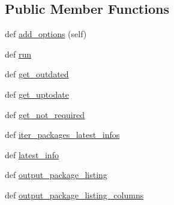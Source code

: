 \subsection*{Public Member Functions}
\begin{DoxyCompactItemize}
\item 
def \hyperlink{classpip_1_1__internal_1_1commands_1_1list_1_1ListCommand_adfb0b7f6deaa1764ffa657a678922b2a}{add\+\_\+options} (self)
\item 
def \hyperlink{classpip_1_1__internal_1_1commands_1_1list_1_1ListCommand_afc673827e6d4ed89888a0b287dbed954}{run}
\item 
def \hyperlink{classpip_1_1__internal_1_1commands_1_1list_1_1ListCommand_a31472ea227963bd0d9dea8a9a6d4d5f2}{get\+\_\+outdated}
\item 
def \hyperlink{classpip_1_1__internal_1_1commands_1_1list_1_1ListCommand_a955234b1f5a0cd66088d27f964a9cb7a}{get\+\_\+uptodate}
\item 
def \hyperlink{classpip_1_1__internal_1_1commands_1_1list_1_1ListCommand_ab6e282b84844c04d03f8da5591a19fa9}{get\+\_\+not\+\_\+required}
\item 
def \hyperlink{classpip_1_1__internal_1_1commands_1_1list_1_1ListCommand_a69e69feee882d365c5deb7271c894bc6}{iter\+\_\+packages\+\_\+latest\+\_\+infos}
\item 
def \hyperlink{classpip_1_1__internal_1_1commands_1_1list_1_1ListCommand_a2c9f936036792522a83fc7654de8e5ae}{latest\+\_\+info}
\item 
def \hyperlink{classpip_1_1__internal_1_1commands_1_1list_1_1ListCommand_a8b97e54c953af1405962712670f61919}{output\+\_\+package\+\_\+listing}
\item 
def \hyperlink{classpip_1_1__internal_1_1commands_1_1list_1_1ListCommand_a7d006a7cd35abcf742a9be53c9f21e78}{output\+\_\+package\+\_\+listing\+\_\+columns}
\end{DoxyCompactItemize}
